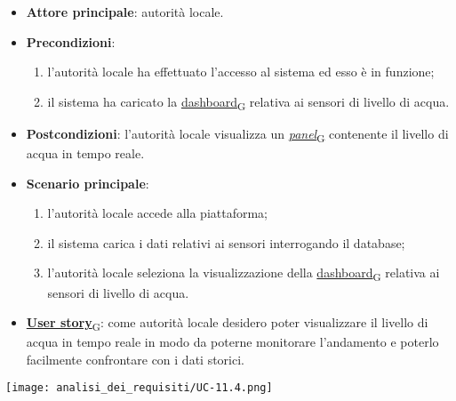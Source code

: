 \begin{itemize}
	\item \textbf{Attore principale}: autorità locale.
	\item \textbf{Precondizioni}:
	      \begin{enumerate}
		      \item l'autorità locale ha effettuato l'accesso al sistema ed esso è in funzione;
		      \item il sistema ha caricato la \href{https://7last.github.io/docs/pb/documentazione-interna/glossario\#dashboard}{dashboard\textsubscript{G}} relativa ai sensori di livello di acqua.
	      \end{enumerate}
	\item \textbf{Postcondizioni}: l'autorità locale visualizza un \href{https://7last.github.io/docs/pb/documentazione-interna/glossario\#panel}{\textit{panel}\textsubscript{G}} contenente il livello di acqua in tempo reale.
	\item \textbf{Scenario principale}:
	      \begin{enumerate}
		      \item l'autorità locale accede alla piattaforma;
		      \item il sistema carica i dati relativi ai sensori interrogando il database;
		      \item l'autorità locale seleziona la visualizzazione della \href{https://7last.github.io/docs/pb/documentazione-interna/glossario\#dashboard}{dashboard\textsubscript{G}} relativa ai sensori di livello di acqua.
	      \end{enumerate}
	\item \href{https://7last.github.io/docs/pb/documentazione-interna/glossario\#user-story}{\textbf{User story}\textsubscript{G}}:
	      come autorità locale desidero poter visualizzare il livello di acqua in tempo reale in modo da poterne monitorare l'andamento
	      e poterlo facilmente confrontare con i dati storici.
\end{itemize}
\begin{center}
	\texttt{[image: analisi\_dei\_requisiti/UC-11.4.png]}
\end{center}

